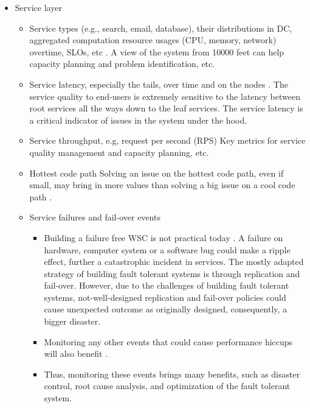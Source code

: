 \begin{itemize}
  \item Service layer
    \begin{itemize}
      \item Service types (e.g., search, email, database), their distributions in DC, aggregated computation resource usages (CPU, memory, network) overtime, SLOs, etc \autocite{DBLP:conf/cloud/ReissTGKK12,DBLP:conf/bigdataconf/LuYXXB17}.
       A view of the system from 10000 feet can help capacity planning and problem identification, etc.

      \item Service latency, especially the tails, over time and on the nodes \autocite{DBLP:journals/cacm/DeanB13, DBLP:conf/nsdi/OusterhoutFBBB19}.
        The service quality to end-users is extremely sensitive to the latency between root services all the ways down to the leaf services. The service latency is a critical indicator of issues in the system under the hood.

      \item Service throughput, e.g, request per second (RPS)
        Key metrics for service quality management and capacity planning, etc.

      \item Hottest code path \autocite{DBLP:journals/micro/KanevDHRMWB16, DBLP:conf/iwqos/GuoCWDFMB19}
        Solving an issue on the hottest code path, even if small, may bring in more values than solving a big issue on a cool code path \autocite{DBLP:conf/ispass/Yasin14}.

      \item Service failures and fail-over events
        \begin{itemize}
          \item Building a failure free WSC is not practical today \autocite{DBLP:books/others/red, DBLP:conf/lisa/Hamilton07, DBLP:journals/cacm/DeanB13}. A failure on hardware, computer system or a software bug could make a ripple effect, further a catastrophic incident in services. The mostly adapted strategy of building fault tolerant systems is through replication and fail-over. However, due to the challenges of building fault tolerant systems, not-well-designed replication and fail-over policies could cause unexpected outcome as originally designed, consequently, a bigger disaster.
          \item Monitoring any other events that could cause performance hiccups will also benefit \autocite{DBLP:conf/lisa/Hamilton07, DBLP:journals/cacm/DeanB13}.
          \item Thus, monitoring these events brings many benefits, such as disaster control, root cause analysis, and optimization of the fault tolerant system.
        \end{itemize}


\end{itemize}
\end{itemize}
